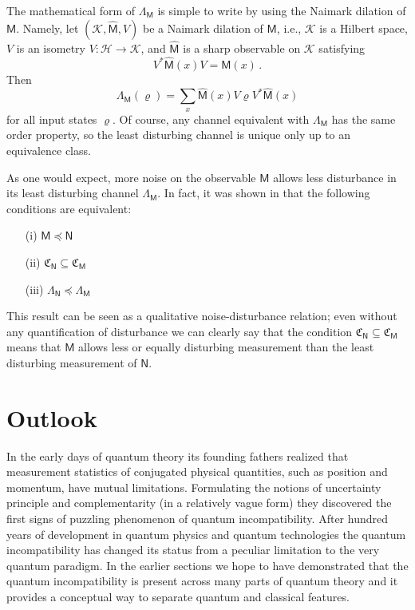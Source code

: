 \documentclass[12pt]{iopart}
\theoremstyle{definition}
\newcommand{\hi}{\mathcal{H}} %
\newcommand{\hik}{\mathcal{K}} %
\newcommand{\Mo}{\mathsf{M}}%
\newcommand{\No}{\mathsf{N}}%
\newcommand{\ch}[1]{\mathfrak{C}_{#1}}
\newcommand{\pleq}{\preceq}
\begin{document}
{The mathematical form of  $\Lambda_\Mo$ is simple to write by using the Naimark dilation of $\Mo$. 
Namely, let $(\hik,\hat{\Mo},V)$ be a Naimark dilation of $\Mo$, i.e., $\hik$ is a Hilbert space, $V$ is an isometry 
$V: \hi \to \hik$, and $\hat{\Mo}$ is a sharp observable  
on $\hik$ satisfying 
\begin{equation}
V^*\hat{\Mo}(x)V = \Mo(x) \, .
\end{equation}
Then
\begin{equation}
\Lambda_\Mo(\varrho) = \sum_x \hat{\Mo}(x) V \varrho V^* \hat{\Mo}(x)
\end{equation}
for all input states $\varrho$.
Of course, any channel equivalent with $\Lambda_\Mo$ has the same order property, so the least disturbing channel is unique only up to an equivalence class. 

As one would expect, more noise on the observable $\Mo$ allows less disturbance in its least disturbing channel $\Lambda_\Mo$.
In fact, it was shown in \cite{HeMi13} that the following conditions are equivalent:
\begin{itemize}
\item[(i)] $\Mo\pleq\No$ 
\item[(ii)] $\ch{\No}\subseteq\ch{\Mo}$
\item[(iii)] $\Lambda_\No \pleq \Lambda_\Mo$
\end{itemize}
This result can be seen as a qualitative noise-disturbance relation; even without any quantification of disturbance we can clearly say that the condition $\ch{\No}\subseteq\ch{\Mo}$
 means that $\Mo$ allows less or equally disturbing measurement than the least disturbing measurement of $\No$.

\section{Outlook}\label{sec:outlook}

In the early days of quantum theory its founding fathers
realized that measurement statistics of conjugated physical quantities, such as position and momentum, have mutual limitations. 
Formulating the notions of uncertainty principle and complementarity (in a relatively vague form) they discovered the first signs of puzzling phenomenon of quantum incompatibility. 
After hundred years of development in quantum physics and quantum 
technologies the quantum incompatibility has changed its status from a peculiar limitation to the very quantum paradigm. 
In the earlier sections we hope to have demonstrated that the quantum incompatibility is present across many parts of quantum theory and it provides a conceptual way to separate quantum and classical features. 

}
\end{document}
